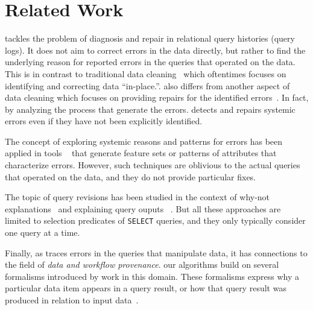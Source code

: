 
\section{Related Work}
\label{s:related}
\sys tackles the problem of diagnosis and repair in relational query
histories (query logs). It does not aim to correct errors in the data
directly, but rather to find the underlying reason for reported errors
in the queries that operated on the data. This is in contrast to
traditional data 
cleaning~\cite{dallachiesa2013nadeef,Abiteboul99,Koudas2006,Galhardas2000
} which oftentimes focuses on identifying and correcting data
``in-place.''. \sys also differs from another aspect of data cleaning which 
focuses on providing repairs for the
identified errors~\cite{Fan2008b, ChuIP13, Beskales2010, Cong2007}.
In fact, by analyzing the process that generate the errors. 
\sys detects and repairs systemic 
errors even if they have not been explicitly identified.

The concept of exploring systemic reasons and patterns for errors has been
applied in tools ~\cite{GolabKKS10, wang2015} that 
generate feature sets or patterns of attributes that characterize
errors. However, such techniques are oblivious to
the actual queries that operated on the data, and they do not provide
particular fixes. 

The topic of query revisions has been studied in the context of
why-not explanations~\cite{Chapman2009, tran2010conquer,tzompanaki14semi } and explaining query ouputs ~\cite{GebalyAGKS14,Wu13,Roy2014}. 
But all these approaches are
limited to selection predicates of \texttt{SELECT} queries, and they
only typically consider one query at a time.

Finally, as \sys traces errors in the queries that manipulate data, it
has connections to the field of \emph{data and workflow provenance}.
our algorithms build on several formalisms introduced by work in this
domain. These formalisms express why a particular data item appears in
a query result, or how that query result was produced in relation to
input data~\cite{BunemanKT01,GKT07-semirings, CheneyCT09, CuiWW00
}.


